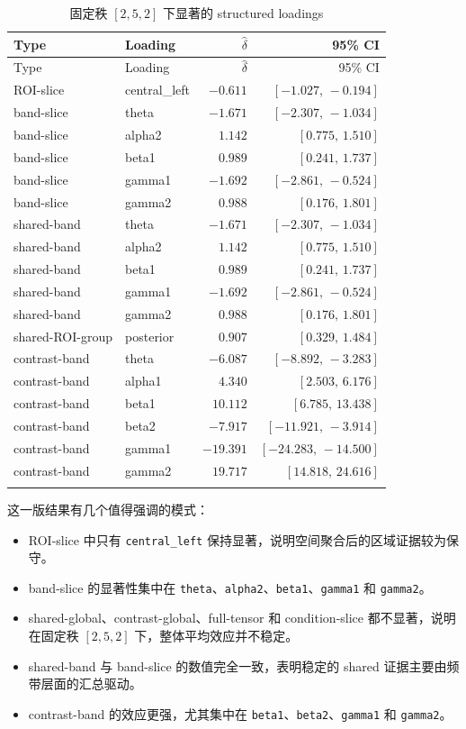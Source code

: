 \documentclass[11pt]{ctexart}
\begin{document}
\begin{longtable}{llrr}
\caption{固定秩 $[2,5,2]$ 下显著的 structured loadings}\\
\toprule
Type & Loading & $\hat\delta$ & 95\% CI \\
\midrule
\endfirsthead
\toprule
Type & Loading & $\hat\delta$ & 95\% CI \\
\midrule
\endhead
ROI-slice & central\_left & $-0.611$ & $[-1.027,\,-0.194]$ \\
band-slice & theta & $-1.671$ & $[-2.307,\,-1.034]$ \\
band-slice & alpha2 & $1.142$ & $[0.775,\,1.510]$ \\
band-slice & beta1 & $0.989$ & $[0.241,\,1.737]$ \\
band-slice & gamma1 & $-1.692$ & $[-2.861,\,-0.524]$ \\
band-slice & gamma2 & $0.988$ & $[0.176,\,1.801]$ \\
shared-band & theta & $-1.671$ & $[-2.307,\,-1.034]$ \\
shared-band & alpha2 & $1.142$ & $[0.775,\,1.510]$ \\
shared-band & beta1 & $0.989$ & $[0.241,\,1.737]$ \\
shared-band & gamma1 & $-1.692$ & $[-2.861,\,-0.524]$ \\
shared-band & gamma2 & $0.988$ & $[0.176,\,1.801]$ \\
shared-ROI-group & posterior & $0.907$ & $[0.329,\,1.484]$ \\
contrast-band & theta & $-6.087$ & $[-8.892,\,-3.283]$ \\
contrast-band & alpha1 & $4.340$ & $[2.503,\,6.176]$ \\
contrast-band & beta1 & $10.112$ & $[6.785,\,13.438]$ \\
contrast-band & beta2 & $-7.917$ & $[-11.921,\,-3.914]$ \\
contrast-band & gamma1 & $-19.391$ & $[-24.283,\,-14.500]$ \\
contrast-band & gamma2 & $19.717$ & $[14.818,\,24.616]$ \\
\bottomrule
\label{tab:structured}
\end{longtable}

这一版结果有几个值得强调的模式：
\begin{itemize}
\item ROI-slice 中只有 \texttt{central\_left} 保持显著，说明空间聚合后的区域证据较为保守。
\item band-slice 的显著性集中在 \texttt{theta}、\texttt{alpha2}、\texttt{beta1}、\texttt{gamma1} 和 \texttt{gamma2}。
\item shared-global、contrast-global、full-tensor 和 condition-slice 都不显著，说明在固定秩 $[2,5,2]$ 下，整体平均效应并不稳定。
\item shared-band 与 band-slice 的数值完全一致，表明稳定的 shared 证据主要由频带层面的汇总驱动。
\item contrast-band 的效应更强，尤其集中在 \texttt{beta1}、\texttt{beta2}、\texttt{gamma1} 和 \texttt{gamma2}。
\end{itemize}
\end{document}

